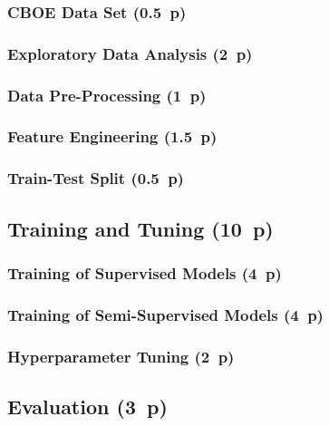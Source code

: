 \subsubsection{CBOE Data Set (0.5~p)}\label{sec:cboe-data-set}

\subsubsection{Exploratory Data Analysis (2~p)}\label{sec:exploratory-data-analysis}

\subsubsection{Data Pre-Processing (1~p)}\label{sec:data-preprocessing}

\subsubsection{Feature Engineering (1.5~p)}\label{sec:feature-engineering}

\subsubsection{Train-Test Split (0.5~p)}\label{sec:train-test-split}

\subsection{Training and Tuning (10~p)}\label{sec:training-and-tuning}

\subsubsection{Training of Supervised
  Models (4~p)}\label{sec:training-of-supervised-models}


\subsubsection{Training of Semi-Supervised
  Models (4~p)}\label{sec:training-of-semi-supervised-models}


\subsubsection{Hyperparameter Tuning (2~p)}\label{sec:hyperparameter-tuning}


\subsection{Evaluation (3~p)}\label{sec:evaluation}

